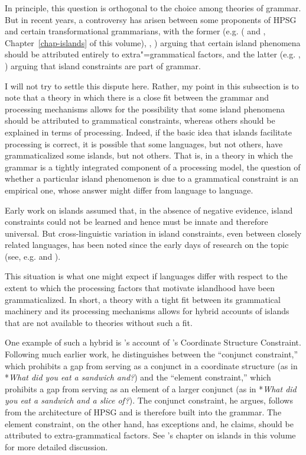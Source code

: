 \documentclass[a4paper]{article}
\begin{document}
In principle, this question is orthogonal to the choice among theories of grammar.  But in recent
years, a controversy has arisen between some proponents of HPSG and certain transformational
grammarians, with the former (e.g. \citeauthor{Chaves2012} (\citeyear{Chaves2012} and
\citeyear{chapters/islands}, Chapter~\ref{chap-islands} of this volume), \citet{HofmeisterSag2010}, \citet*{HofmeisterEtal2013}) arguing that certain island phenomena should be attributed entirely to extra"=grammatical factors, and the latter (e.g. \citet{Phillips2013}, \citet{SWP2012a-u}) arguing that island constraints are part of grammar.

I will not try to settle this dispute here.  Rather, my point in this subsection is to note that a theory in which there is a close fit between the grammar and processing mechanisms allows for the possibility that some island phenomena should be attributed to grammatical constraints, whereas others should be explained in terms of processing.  Indeed, if the basic idea that islands facilitate processing is correct, it is possible that some languages, but not others, have grammaticalized some islands, but not others.  That is, in a theory in which the grammar is a tightly integrated component of a processing model, the question of whether a particular island phenomenon is due to a grammatical constraint is an empirical one, whose answer might differ from language to language. 

Early work on islands assumed that, in the absence of negative evidence, island constraints could not be learned and hence must be innate and therefore universal.  But cross-linguistic variation in island constraints, even between closely related languages, has been noted since the early days of research on the topic (see, e.g. \citet{Erteschik73a-u} and \citet{EngdahlEjerhed82}).

This situation is what one might expect if languages differ with respect to the extent to which the processing factors that motivate islandhood have been grammaticalized.  In short, a theory with a tight fit between its grammatical machinery and its processing mechanisms allows for hybrid accounts of islands that are not available to theories without such a fit.

One example of such a hybrid is \citeauthor{Chaves2012}'s \citeyearpar{Chaves2012} account of \citeauthor{Ross67}'s Coordinate Structure Constraint.  Following much earlier work, he distinguishes between the ``conjunct constraint,'' which prohibits a gap from serving as a conjunct in a coordinate structure (as in *{\it What did you eat a sandwich and?}) and the ``element constraint,'' which prohibits a gap from serving as an element of a larger conjunct (as in *{\it What did you eat a sandwich and a slice of?}).  The conjunct constraint, he argues, follows from the architecture of HPSG and is therefore built into the grammar.  The element constraint, on the other hand, has exceptions and, he claims, should be attributed to extra-grammatical factors.  See \citeauthor{Chaves2012}'s chapter on islands in this volume for more detailed discussion. 
\end{document}
